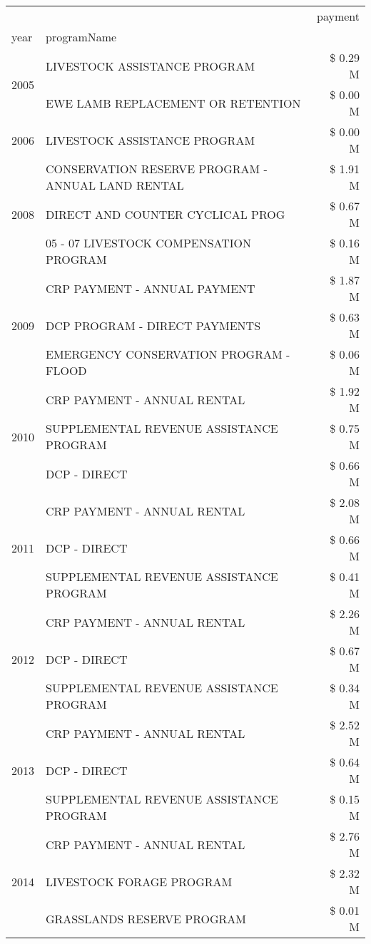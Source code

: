 \begin{tabular}{llr}
\toprule
 &  & payment \\
year & programName &  \\
\midrule
\multirow[t]{2}{*}{2005} & LIVESTOCK ASSISTANCE PROGRAM & \$ 0.29 M \\
 & EWE LAMB REPLACEMENT OR RETENTION & \$ 0.00 M \\
\cline{1-3}
2006 & LIVESTOCK ASSISTANCE PROGRAM & \$ 0.00 M \\
\cline{1-3}
\multirow[t]{3}{*}{2008} & CONSERVATION RESERVE PROGRAM - ANNUAL LAND RENTAL & \$ 1.91 M \\
 & DIRECT AND COUNTER CYCLICAL PROG & \$ 0.67 M \\
 & 05 - 07 LIVESTOCK COMPENSATION PROGRAM & \$ 0.16 M \\
\cline{1-3}
\multirow[t]{3}{*}{2009} & CRP PAYMENT - ANNUAL PAYMENT & \$ 1.87 M \\
 & DCP PROGRAM - DIRECT PAYMENTS & \$ 0.63 M \\
 & EMERGENCY CONSERVATION PROGRAM - FLOOD & \$ 0.06 M \\
\cline{1-3}
\multirow[t]{3}{*}{2010} & CRP PAYMENT - ANNUAL RENTAL & \$ 1.92 M \\
 & SUPPLEMENTAL REVENUE ASSISTANCE PROGRAM & \$ 0.75 M \\
 & DCP - DIRECT & \$ 0.66 M \\
\cline{1-3}
\multirow[t]{3}{*}{2011} & CRP PAYMENT - ANNUAL RENTAL & \$ 2.08 M \\
 & DCP - DIRECT & \$ 0.66 M \\
 & SUPPLEMENTAL REVENUE ASSISTANCE PROGRAM & \$ 0.41 M \\
\cline{1-3}
\multirow[t]{3}{*}{2012} & CRP PAYMENT - ANNUAL RENTAL & \$ 2.26 M \\
 & DCP - DIRECT & \$ 0.67 M \\
 & SUPPLEMENTAL REVENUE ASSISTANCE PROGRAM & \$ 0.34 M \\
\cline{1-3}
\multirow[t]{3}{*}{2013} & CRP PAYMENT - ANNUAL RENTAL & \$ 2.52 M \\
 & DCP - DIRECT & \$ 0.64 M \\
 & SUPPLEMENTAL REVENUE ASSISTANCE PROGRAM & \$ 0.15 M \\
\cline{1-3}
\multirow[t]{3}{*}{2014} & CRP PAYMENT - ANNUAL RENTAL & \$ 2.76 M \\
 & LIVESTOCK FORAGE PROGRAM & \$ 2.32 M \\
 & GRASSLANDS RESERVE PROGRAM & \$ 0.01 M \\

\end{tabular}
